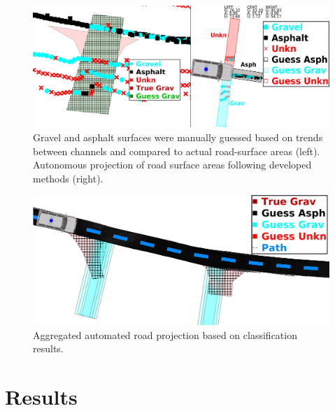 \documentclass[journal,onecolumn]{IEEEtran}
\begin{document}
			\begin{figure}[H]
				\centering
				\includegraphics[width=0.9\linewidth]{figures/visual_v_auto}
				\caption[Projected Guess vs Truth]{Gravel and asphalt surfaces were manually guessed based on trends between channels and compared to actual road-surface areas (left). Autonomous projection of road surface areas following developed methods (right).}
				\label{fig:visual_v_auto}
			\end{figure}
			
			\begin{figure}[H]
				\centering
				\includegraphics[width=0.9\linewidth]{figures/auto_guess_v_truth}
				\caption[Projected Guess over Time vs Truth]{Aggregated automated road projection based on classification results.}
				\label{fig:auto_guess_v_truth}
			\end{figure}
			
				
	\section{Results}
	
\end{document}

